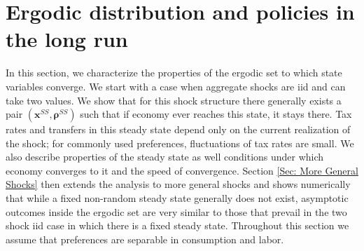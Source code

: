 \documentclass[thmsb,11pt]{article}
\begin{document}
\section{Ergodic distribution and policies in the long run } \label{sec: SteadyStates}
In this section, we characterize the properties of the ergodic set to which state variables converge. We start with a case when aggregate shocks are iid and can take two values. We show that for this shock structure there generally exists a  pair $\left( \bm{x}^{SS},\bm{\rho} ^{SS}\right) $  such that if economy ever reaches this state, it stays there.  Tax rates and transfers in this steady state depend only on the current realization of the shock;  for commonly used preferences, fluctuations of tax rates are small. We also describe properties of the steady state as well conditions under which economy converges to it and the speed of convergence.   Section \ref{Sec: More General Shocks}  then extends the analysis to more general shocks and shows numerically that while a fixed non-random steady state generally does not exist, asymptotic outcomes inside the  ergodic set are very similar to those
that prevail in the two shock iid case in which there is a fixed steady state. Throughout this section we assume that preferences are separable in consumption and
labor.
%
%
\end{document}
